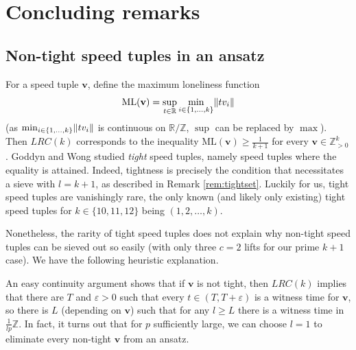 \documentclass[11pt]{amsart}
\DeclarePairedDelimiter\norm{\lVert}{\rVert}
\newcommand{\R}{\mathbb{R}}
\newcommand{\Z}{\mathbb{Z}}
\newcommand{\vbf}{\mathbf{v}}
\newcommand{\ml}{\mathrm{ML}}
\newcommand{\onetok}{(1, 2, \dots, k)}
\theoremstyle{definition}
\theoremstyle{remark}
\begin{document}
\section{Concluding remarks}
\label{sec:conclude}
\subsection{Non-tight speed tuples in an ansatz}
For a speed tuple $\vbf$, define the maximum loneliness function \[\ml(\vbf)=\sup_{t\in\R}\min_{i\in\{1,\ldots,k\}}\norm{tv_i}\] 
(as $\min_{i\in\{1, \ldots, k\}} \norm{tv_i}$ is continuous on $\R/\Z$, $\sup$ can be replaced by $\max$).
Then $LRC(k)$ corresponds to the inequality $\ml(\vbf)\geq\frac{1}{k+1}$ for every $\vbf\in\Z_{>0}^k$. 
Goddyn and Wong \cite{goddyn2006tight} studied \emph{tight} speed tuples, namely speed tuples where the equality is attained. 
Indeed, tightness is precisely the condition that necessitates a sieve with $l=k+1$, as described in Remark \ref{rem:tightset}. 
Luckily for us, tight speed tuples are vanishingly rare, 
the only known (and likely only existing) tight speed tuples for $k\in\{10,11,12\}$ being $\onetok$.

Nonetheless, the rarity of tight speed tuples does not explain why non-tight speed tuples can be sieved out so easily 
(with only three $c=2$ lifts for our prime $k+1$ case). We have the following heuristic explanation.

An easy continuity argument shows that if $\vbf$ is not tight, 
then $LRC(k)$ implies that there are $T$ and $\varepsilon>0$ such that every $t\in(T,T+\varepsilon)$ is a witness time for $\vbf$,
so there is $L$ (depending on $\vbf$) such that for any $l\geq L$ there is a witness time in $\frac{1}{lp}\Z$. 
In fact, it turns out that for $p$ sufficiently large, we can choose $l=1$ to eliminate every non-tight $\vbf$ from an ansatz.
\end{document}
